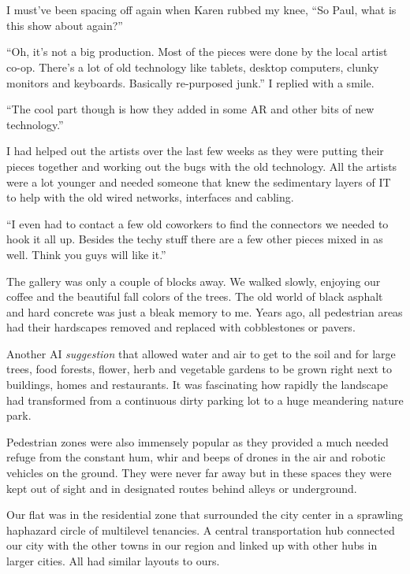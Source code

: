 \section{}

I must've been spacing off again when Karen rubbed my knee, ``So
Paul, what is this show about again?''

``Oh, it's not a big production. Most of the pieces were done by
the local artist co-op. There's a lot of old technology like
tablets, desktop computers, clunky monitors and keyboards.  Basically
re-purposed junk.'' I replied with a smile.

``The cool part though is how they added in some AR and other bits of
new technology.''

I had helped out the artists over the last few weeks as they
were putting their pieces together and working out the bugs with
the old technology. All the artists were a lot younger and
needed someone that knew the sedimentary layers of IT to help
with the old wired networks, interfaces and cabling.

``I even had to contact a few old coworkers to find the
connectors we needed to hook it all up.  Besides the techy
stuff there are a few other pieces mixed in as well. Think you
guys will like it.''


The gallery was only a couple of blocks away. We walked
slowly, enjoying our coffee and the beautiful fall colors of the
trees. The old world of black asphalt and hard concrete was just
a bleak memory to me. Years ago, all pedestrian areas had
their hardscapes removed and replaced with cobblestones or
pavers.

Another AI \emph{suggestion} that allowed water and air to get
to the soil and for large trees, food forests, flower, herb and
vegetable gardens to be grown right next to buildings, homes and
restaurants. It was fascinating how rapidly the landscape had
transformed from a continuous dirty parking lot to a huge
meandering nature park.

Pedestrian zones were also immensely popular as they provided a
much needed refuge from the constant hum, whir and beeps of
drones in the air and robotic vehicles on the ground. They were
never far away but in these spaces they were kept out of sight
and in designated routes behind alleys or underground.

Our flat was in the residential zone that surrounded the
city center in a sprawling haphazard circle of multilevel
tenancies. A central transportation hub connected our city with
the other towns in our region and linked up with other hubs in
larger cities. All had similar layouts to ours.

